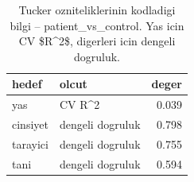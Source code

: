 \begin{table}[htbp]
  \centering
  \caption{Tucker ozniteliklerinin kodladigi bilgi -- patient\_vs\_control. Yas icin CV \$R\textasciicircum{}2\$, digerleri icin dengeli dogruluk.}
  \label{tab:content_patient_vs_control}
  \small
  \begin{tabular}{llr}
    \toprule
    hedef & olcut & deger \\
    \midrule
    yas & CV R\textasciicircum{}2 & 0.039 \\
    cinsiyet & dengeli dogruluk & 0.798 \\
    tarayici & dengeli dogruluk & 0.755 \\
    tani & dengeli dogruluk & 0.594 \\
    \bottomrule
  \end{tabular}
\end{table}
